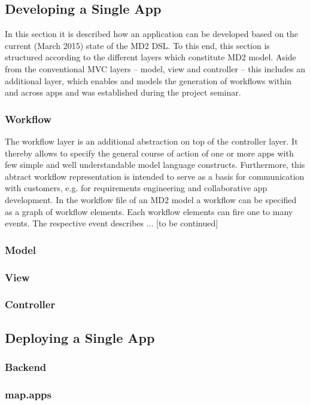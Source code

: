 
\subsection{Developing a Single App} 
\label{subsec:SingleAppDev}
In this section it is described how an application can be developed based on the current (March 2015) state of the MD2 DSL. To this end, this section is structured according to the different layers which constitute MD2 model. Aside from the conventional MVC layers -- model, view and controller -- this includes an additional layer, which enables and models the generation of workflows within and across apps and was established during the project seminar.

\subsubsection{Workflow} 
\label{subsubsec:Workflow}
The workflow layer is an additional abstraction on top of the controller layer. It thereby allows to specify the general course of action of one or more apps with few simple and well understandable model language constructs. Furthermore, this abtract workflow representation is intended to serve as a basis for communication with customers, e.g. for requirements engineering and collaborative app development.
In the workflow file of an MD2 model a workflow can be specified as a graph of workflow elements. Each workflow elements can fire one to many events. The respective event describes ... [to be continued]


\subsubsection{Model} 
\label{subsubsec:Model}

\subsubsection{View} 
\label{subsubsec:View}

\subsubsection{Controller} 
\label{subsubsec:Controller}


\subsection{Deploying a Single App}
\label{subsec:SingleAppDep}

\subsubsection{Backend} 
\label{subsubsec:Backend}

\subsubsection{map.apps} 
\label{subsubsec:mapapps}
